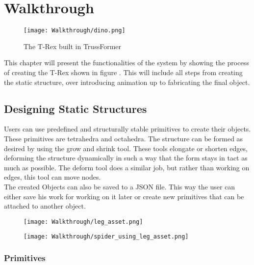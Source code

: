 \chapter{Walkthrough}\label{ch:walkthrough}
\begin{figure}[h!]
    \texttt{[image: Walkthrough/dino.png]}
    \centering
    \caption{The T-Rex built in TrussFormer}
    \label{fig:t_rex}
\end{figure}
This chapter will present the functionalities of the system by showing the process of creating the T-Rex shown in figure . This will include all steps from creating the static structure, over introducing animation up to fabricating the final object.

\section{Designing Static Structures}
Users can use predefined and structurally stable primitives to create their objects. These primitives are tetrahedra and octahedra. The structure can be formed as desired by using the grow and shrink tool. These tools elongate or shorten edges, deforming the structure dynamically in such a way that the form stays in tact as much as possible. The deform tool does a similar job, but rather than working on edges, this tool can move nodes.\\
The created Objects can also be saved to a JSON file. This way the user can either save his work for working on it later or create new primitives that can be attached to another object.
\begin{figure}
  \centering
  \begin{minipage}{.5\textwidth}
    \centering
    \texttt{[image: Walkthrough/leg\_asset.png]}
    \label{fig:leg_asset}
  \end{minipage}%
  \begin{minipage}{.5\textwidth}
    \centering
    \texttt{[image: Walkthrough/spider\_using\_leg\_asset.png]}
    \label{fig:spider_in_progress}
  \end{minipage}
\end{figure}

\subsection{Primitives}

